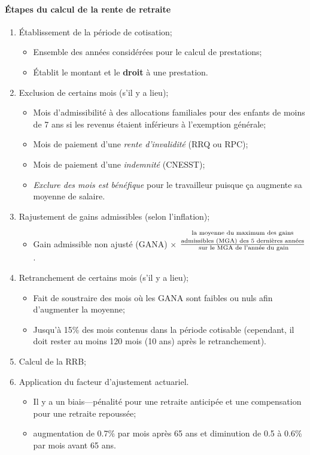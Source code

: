 \documentclass[10pt, french]{article}
\begin{document}
\begin{multicols*}{3}
\paragraph{Étapes du calcul de la rente de retraite}
\begin{enumerate}[leftmargin = *]
	\item	Établissement de la période de cotisation;
		\begin{itemize}[leftmargin = *]
		\item	Ensemble des années considérées pour le calcul de prestations;		
		\item	Établit le montant et le \textbf{droit} à une prestation.
		\end{itemize}
	\item	Exclusion de certains mois (s'il y a lieu);
		\begin{itemize}[leftmargin = *]
		\item	Mois d'admissibilité à des allocations familiales pour des enfants de moins de 7 ans si les revenus étaient inférieurs à l'exemption générale;
		\item	Mois de paiement d'une \textit{rente d'invalidité }(RRQ ou RPC);
		\item	Mois de paiement d'une \textit{indemnité} (CNESST);
		\item	\textit{Exclure des mois est bénéfique} pour le travailleur puisque ça augmente sa moyenne de salaire.
		\end{itemize}
	\item	Rajustement de gains admissibles (selon l'inflation);
		\begin{itemize}[leftmargin = *]
		\item	Gain admissible non ajusté (GANA) $\times$ $\frac{\text{\shortstack{la moyenne du maximum des gains\\ admissibles (MGA) des 5 dernières années}}}{\text{ sur le MGA de l'année du gain}}$.
		\end{itemize}
	\item	Retranchement de certains mois (s'il y a lieu);
		\begin{itemize}[leftmargin = *]
		\item	Fait de soustraire des mois où les GANA sont faibles ou nuls afin d'augmenter la moyenne;
		\item	Jusqu'à 15\% des mois contenus dans la période cotisable (cependant, il doit rester au moins 120 mois (10 ans) après le retranchement).
		\end{itemize}
	\item	Calcul de la RRB;
	\item	Application du facteur d'ajustement actuariel.
		\begin{itemize}[leftmargin = *]
		\item	Il y a un biais---pénalité pour une retraite anticipée et une compensation pour une retraite repoussée;
		\item	augmentation de 0.7\% par mois après 65 ans et diminution de 0.5 à 0.6\% par mois  avant 65 ans.
		\end{itemize}
\end{enumerate}


\end{multicols*}
\end{document}
